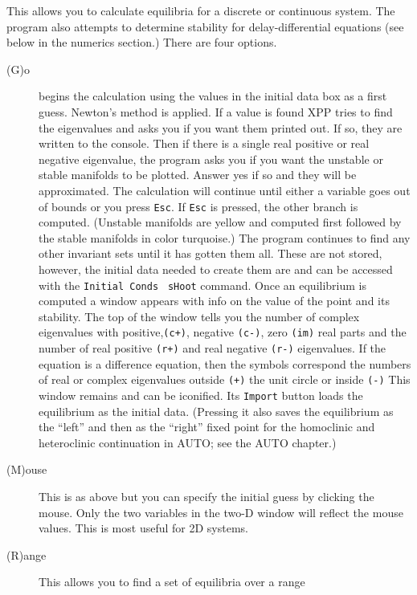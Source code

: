 \documentclass{article}
\newcommand{\tc}[1]{\addcontentsline{toc}{subsection}{#1}}
\begin{document}
\begin{description}
\begin{description}
\end{description}


\tc{Equilibria}\item[(S)ing pts]  This allows you to calculate
equilibria for a discrete or continuous system.  The program also
attempts to determine stability for delay-differential equations (see
below in the numerics section.) There
 are four options.
\begin{description} 
	\item[(G)o] begins the calculation   using the values in the initial 
data box as a first guess.  Newton's method is applied.  If a value is found XPP
 tries to find the eigenvalues and asks you if you want them printed out.  If so,
 they are written to the console.  Then if there is a single real positive or
 real negative eigenvalue, the program asks you if you want the unstable or
 stable manifolds to be plotted.  Answer yes if so and they will be
 approximated. The calculation will continue until either a variable
goes out
 of bounds or you press {\tt Esc}.  If {\tt Esc} is pressed, the other
branch is
 computed. (Unstable manifolds are yellow and computed first followed
by the stable manifolds in color turquoise.) 
 The program continues to find any other invariant sets until it has gotten 
them all.  These are not stored, however, the initial data needed to
create them are and can be accessed with the {\tt Initial Conds} {\tt
sHoot} command. 
Once an 
equilibrium is computed a window 
appears with info on the value of the point and its stability.  The top of 
the window tells you the number of complex eigenvalues with positive,{\tt (c+)}, 
negative {\tt (c-)}, zero {\tt (im)}  real parts and the number of
real positive
{\tt  (r+)}  and 
real negative { \tt (r-)}  eigenvalues. If the equation is a difference equation, 
then the symbols correspond the numbers of real or complex eigenvalues 
outside {\tt (+)}  the unit circle or inside { \tt (-)}
This window remains and can be iconified.  Its {\tt Import} button
loads the equilibrium as the initial data.  (Pressing it also saves the equilibrium as the ``left'' and then
as the ``right'' fixed point for the homoclinic and heteroclinic continuation in AUTO; see the AUTO chapter.)
\item[(M)ouse]  This is as above but you can specify the initial guess by 
clicking the mouse.  Only the two variables in the two-D window will reflect 
the mouse values.  This is most useful for 2D systems.
\item[(R)ange]  This allows you to find a set of equilibria over a range

\end{description}
\end{description}
\end{document}
